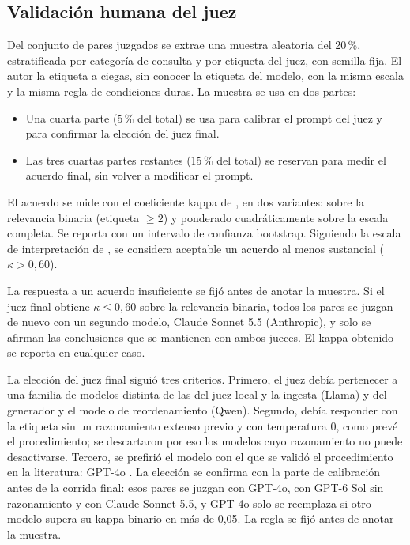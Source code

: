 \subsection{Validación humana del juez}

Del conjunto de pares juzgados se extrae una muestra aleatoria del 20\,\%, estratificada por categoría de consulta y por etiqueta del juez, con semilla fija. El autor la etiqueta a ciegas, sin conocer la etiqueta del modelo, con la misma escala y la misma regla de condiciones duras. La muestra se usa en dos partes:
\begin{itemize}
    \item Una cuarta parte (5\,\% del total) se usa para calibrar el prompt del juez y para confirmar la elección del juez final.
    \item Las tres cuartas partes restantes (15\,\% del total) se reservan para medir el acuerdo final, sin volver a modificar el prompt.
\end{itemize}

El acuerdo se mide con el coeficiente kappa de \citet{Cohen1960}, en dos variantes: sobre la relevancia binaria (etiqueta $\geq 2$) y ponderado cuadráticamente sobre la escala completa. Se reporta con un intervalo de confianza bootstrap. Siguiendo la escala de interpretación de \citet{Landis1977}, se considera aceptable un acuerdo al menos sustancial ($\kappa > 0{,}60$).

La respuesta a un acuerdo insuficiente se fijó antes de anotar la muestra. Si el juez final obtiene $\kappa \leq 0{,}60$ sobre la relevancia binaria, todos los pares se juzgan de nuevo con un segundo modelo, Claude Sonnet 5.5 (Anthropic), y solo se afirman las conclusiones que se mantienen con ambos jueces. El kappa obtenido se reporta en cualquier caso.

La elección del juez final siguió tres criterios. Primero, el juez debía pertenecer a una familia de modelos distinta de las del juez local y la ingesta (Llama) y del generador y el modelo de reordenamiento (Qwen). Segundo, debía responder con la etiqueta sin un razonamiento extenso previo y con temperatura 0, como prevé el procedimiento; se descartaron por eso los modelos cuyo razonamiento no puede desactivarse. Tercero, se prefirió el modelo con el que se validó el procedimiento en la literatura: GPT-4o \citep{Upadhyay2024}. La elección se confirma con la parte de calibración antes de la corrida final: esos pares se juzgan con GPT-4o, con GPT-6 Sol sin razonamiento y con Claude Sonnet 5.5, y GPT-4o solo se reemplaza si otro modelo supera su kappa binario en más de 0,05. La regla se fijó antes de anotar la muestra.

